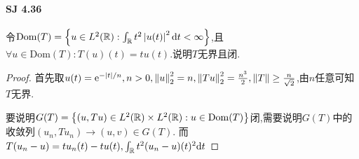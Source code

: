 \documentclass[UTF8]{article}
\begin{document}
\paragraph*{SJ 4.36}令$\mathrm{Dom}(T)=\left\{u\in L^2(\mathbb{R}):\int_{\mathbb{R}}t^2\left|u(t)\right|^2\mathrm{d} t<\infty\right\}$,且$\forall u\in \mathrm{Dom}(T):T(u)(t)=tu(t)$.说明$T$无界且闭.
\begin{proof}
    首先取$u(t)=\mathrm{e}^{-\left|t\right|/n},n>0,\left\|u\right\|^2_2=n,\left\|Tu\right\|^2_2=\frac{n^3}{2},\left\|T\right\|\geq \frac{n}{\sqrt{2}}$,由$n$任意可知$T$无界.
    
    要说明$G(T)=\left\{(u,Tu)\in L^2(\mathbb{R})\times L^2(\mathbb{R}):u\in \mathrm{Dom}(T)\right\}$闭,需要说明$G(T)$中的收敛列$(u_n,Tu_n)\to (u,v)\in G(T)$. 而$T(u_n-u)=tu_n(t)-tu(t),\int_{\mathbb{R}} t^2(u_n-u)(t)^2\mathrm{d} t$
\end{proof}
\end{document}
